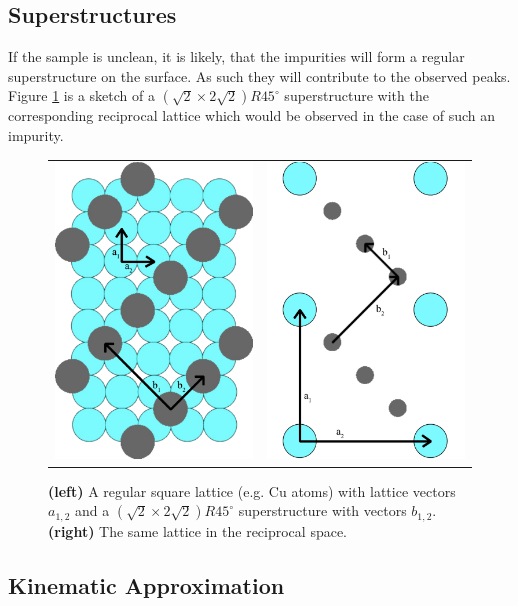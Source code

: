 \documentclass[a4paper]{scrartcl}
\numberwithin{equation}{section}
\numberwithin{figure}{section}
\numberwithin{table}{section}
\begin{document}
\subsection{Superstructures}
If the sample is unclean, it is likely, that the impurities will form a regular superstructure on the surface. As such they will contribute to the observed peaks. Figure \ref{fig:superstructure} is a sketch of a $(\sqrt{2} \times 2\sqrt{2})R45^\circ$ superstructure with the corresponding reciprocal lattice which would be observed in the case of such an impurity.
\begin{figure}[!bthp]
        \begin{center}
        \begin{tabular}{l r}
        		\includegraphics[width=0.2\linewidth]{img/superstructure.pdf}
       	&
       		\includegraphics[width=0.2\linewidth]{img/superstructure2.pdf}
		  \end{tabular}
        \end{center}
        \caption{
			\small \textbf{(left)} A regular square lattice (e.g. Cu atoms) with lattice vectors $a_{1,2}$ and a  $(\sqrt{2} \times 2\sqrt{2})R45^\circ$ superstructure with vectors $b_{1,2}$.
			\textbf{(right)} The same lattice in the reciprocal space.
        }
        \label{fig:superstructure}
\end{figure}


\subsection{Kinematic Approximation}


 

\end{document}
